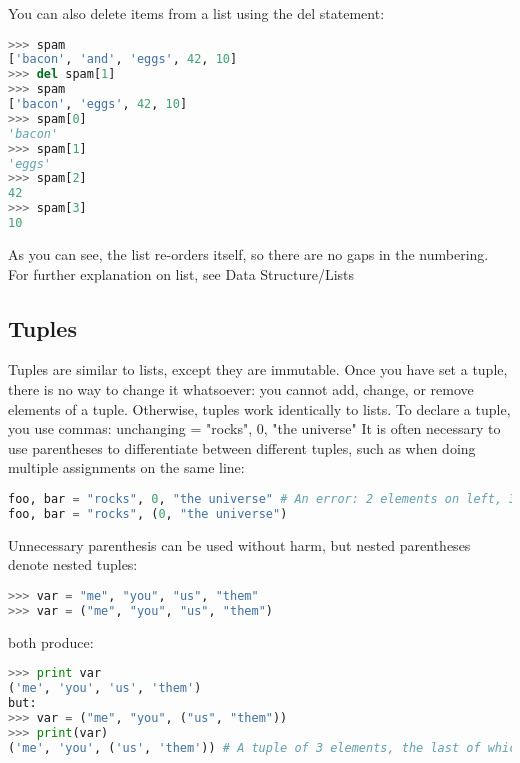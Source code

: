 You can also delete items from a list using the del statement:
\lstset{basicstyle=\scriptsize, numbers=left, captionpos=b, tabsize=4}
\begin{lstlisting}[caption=delete Operation on List,language={Python},
xleftmargin=15pt, label=lst:deleteoperationonlist]
>>> spam
['bacon', 'and', 'eggs', 42, 10]
>>> del spam[1]
>>> spam
['bacon', 'eggs', 42, 10]
>>> spam[0]
'bacon'
>>> spam[1]
'eggs'
>>> spam[2]
42
>>> spam[3]
10
\end{lstlisting}

As you can see, the list re-orders itself, so there are no gaps in the
numbering.  For further explanation on list, see Data Structure/Lists

\subsection{Tuples}
Tuples are similar to lists, except they are immutable. Once you have set a
tuple, there is no way to change it whatsoever: you cannot add, change, or
remove elements of a tuple. Otherwise, tuples work identically to lists.  To
declare a tuple, you use commas: unchanging = "rocks", 0, "the universe" It is
often necessary to use parentheses to differentiate between different tuples,
such as when doing multiple assignments on the same line:
\lstset{basicstyle=\scriptsize, numbers=left, captionpos=b, tabsize=4}
\begin{lstlisting}[caption=Tuple Definition 1,language={Python},
xleftmargin=15pt, label=lst:tupledefinition1]
foo, bar = "rocks", 0, "the universe" # An error: 2 elements on left, 3 on right
foo, bar = "rocks", (0, "the universe")
\end{lstlisting}

Unnecessary parenthesis can be used without harm, but nested parentheses denote
nested tuples:
\lstset{basicstyle=\scriptsize, numbers=left, captionpos=b, tabsize=4}
\begin{lstlisting}[caption=Tuple Definition 2,language={Python},
xleftmargin=15pt, label=lst:tupledefinitio2]
>>> var = "me", "you", "us", "them"
>>> var = ("me", "you", "us", "them")
\end{lstlisting}
both produce:

\lstset{basicstyle=\scriptsize, numbers=left, captionpos=b, tabsize=4}
\begin{lstlisting}[caption=Tuple Definition 3,language={Python},
xleftmargin=15pt, label=lst:tupledefinition3]
>>> print var 
('me', 'you', 'us', 'them')
but:
>>> var = ("me", "you", ("us", "them"))
>>> print(var)
('me', 'you', ('us', 'them')) # A tuple of 3 elements, the last of which is itself a tuple.
\end{lstlisting}

